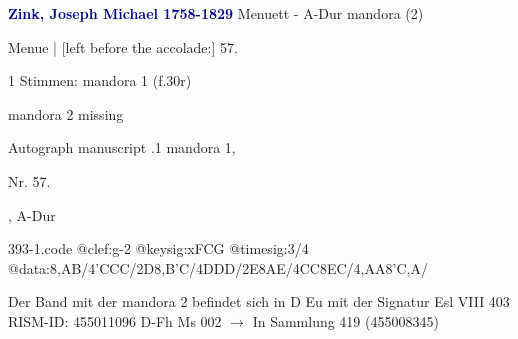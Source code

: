 \documentclass[twocolumn]{book}
\begin{document}
\newline \par \vspace{7pt} \textcolor{darkblue}{\textbf{Zink, Joseph Michael  1758-1829}}
\newline Menuett - A-Dur
\newline mandora (2)
\newline \begin{itshape}[f.30r, at left:] Menue | [left before the accolade:] 57.\end{itshape} 
\newline \textcolor{darkblue}{}  1 Stimmen: mandora 1  (f.30r)
\newline \begin{small} mandora 2 missing\end{small} 
\newline Autograph manuscript
.1  mandora 1, \begin{itshape}Nr. 57.\end{itshape}, A-Dur  
\begin{filecontents*}{393-1.code}
@clef:g-2
@keysig:xFCG
@timesig:3/4
@data:{8,AB}/4'CCC/2D{8,B'C}/4DDD/2E{8AE}/4CC{8EC}/4,AA{8'C,A}/
\end{filecontents*}
\newline
%
\newline Der Band mit der mandora 2 befindet sich in D Eu mit der Signatur Esl VIII 403
\newline RISM-ID: 455011096
\newline D-Fh  Ms 002
\newline $\rightarrow$ In Sammlung 419 (455008345)
      
\end{document}
